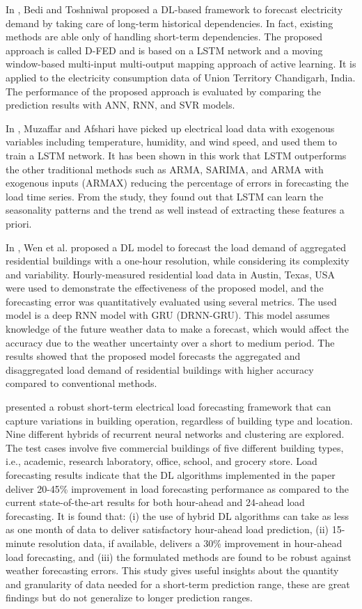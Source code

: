 In \cite{BEDI20191312}, Bedi and Toshniwal proposed a DL-based framework to forecast electricity demand by taking care of long-term historical dependencies.
In fact, existing methods are able only of handling short-term dependencies.
The proposed approach is called D-FED and is based on a LSTM network and a moving window-based multi-input multi-output mapping approach of active learning.
It is applied to the electricity consumption data of Union Territory Chandigarh, India.
The performance of the proposed approach is evaluated by comparing the prediction results with ANN, RNN, and SVR models.

In \cite{MUZAFFAR20192922}, Muzaffar and Afshari have picked up electrical load data with exogenous variables including temperature, humidity, and wind speed, and used them to train a LSTM network.
It has been shown in this work that LSTM outperforms the other traditional methods such as ARMA, SARIMA, and ARMA with exogenous inputs (ARMAX) reducing the percentage of errors in forecasting the load time series.
From the study, they found out that LSTM can learn the seasonality patterns and the trend as well instead of extracting these features a priori.

In \cite{WEN2020106073}, Wen et al. proposed a DL model to forecast the load demand of aggregated residential buildings with a one-hour resolution, while considering its complexity and variability.
Hourly-measured residential load data in Austin, Texas, USA were used to demonstrate the effectiveness of the proposed model, and the forecasting error was quantitatively evaluated using several metrics.
The used model is a deep RNN model with GRU (DRNN-GRU).
This model assumes knowledge of the future weather data to make a forecast, which would affect the accuracy due to the weather uncertainty over a short to medium period.
The results showed that the proposed model forecasts the aggregated and disaggregated load demand of residential buildings with higher accuracy compared to conventional methods.

\cite{CHITALIA2020115410} presented a robust short-term electrical load forecasting framework that can capture variations in building operation, regardless of building type and location.
Nine different hybrids of recurrent neural networks and clustering are explored.
The test cases involve five commercial buildings of five different building types, i.e., academic, research laboratory, office, school, and grocery store.
Load forecasting results indicate that the DL algorithms implemented in the paper deliver 20-45\% improvement in load forecasting performance as compared to the current state-of-the-art results for both hour-ahead and 24-ahead load forecasting.
It is found that:
(i) the use of hybrid DL algorithms can take as less as one month of data to deliver satisfactory hour-ahead load prediction,
(ii) 15-minute resolution data, if available, delivers a 30\% improvement in hour-ahead load forecasting,
and (iii) the formulated methods are found to be robust against weather forecasting errors.
This study gives useful insights about the quantity and granularity of data needed for a short-term prediction range, these are great findings but do not generalize to longer prediction ranges.

